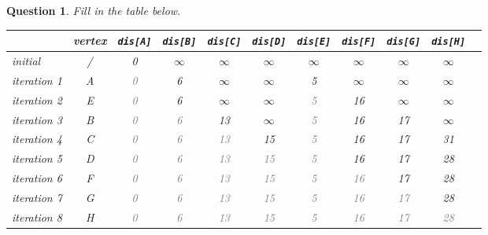 \documentclass[10.5pt]{article}
\newtheorem{Q}{Question}
\begin{document}
\begin{Q}
	Fill in the table below.
	\begin{table}[htbp]
		\begin{center}
			\begin{tabular}{|l|c|c|c|c|c|c|c|c|c| p{3cm}|}
				\hline
				            & vertex & \texttt{dis[A]}     & \texttt{dis[B]}     & \texttt{dis[C]}      & \texttt{dis[D]}      & \texttt{dis[E]}     & \texttt{dis[F]}      & \texttt{dis[G]}      & \texttt{dis[H]}      \\
				\hline
				initial     & /      & 0                   & $\infty$            & $\infty$             & $\infty$             & $\infty$            & $\infty$             & $\infty$             & $\infty$             \\
				\hline
				iteration 1 & A      & \textcolor{gray}{0} & 6                   & $\infty$             & $\infty$             & 5                   & $\infty$             & $\infty$             & $\infty$             \\
				\hline
				iteration 2 & E      & \textcolor{gray}{0} & 6                   & $\infty$             & $\infty$             & \textcolor{gray}{5} & 16                   & $\infty$             & $\infty$             \\
				\hline
				iteration 3 & B      & \textcolor{gray}{0} & \textcolor{gray}{6} & 13                   & $\infty$             & \textcolor{gray}{5} & 16                   & 17                   & $\infty$             \\
				\hline
				iteration 4 & C      & \textcolor{gray}{0} & \textcolor{gray}{6} & \textcolor{gray}{13} & 15                   & \textcolor{gray}{5} & 16                   & 17                   & 31                   \\
				\hline
				iteration 5 & D      & \textcolor{gray}{0} & \textcolor{gray}{6} & \textcolor{gray}{13} & \textcolor{gray}{15} & \textcolor{gray}{5} & 16                   & 17                   & 28                   \\
				\hline
				iteration 6 & F      & \textcolor{gray}{0} & \textcolor{gray}{6} & \textcolor{gray}{13} & \textcolor{gray}{15} & \textcolor{gray}{5} & \textcolor{gray}{16} & 17                   & 28                   \\
				\hline
				iteration 7 & G      & \textcolor{gray}{0} & \textcolor{gray}{6} & \textcolor{gray}{13} & \textcolor{gray}{15} & \textcolor{gray}{5} & \textcolor{gray}{16} & \textcolor{gray}{17} & 28                   \\
				\hline
				iteration 8 & H      & \textcolor{gray}{0} & \textcolor{gray}{6} & \textcolor{gray}{13} & \textcolor{gray}{15} & \textcolor{gray}{5} & \textcolor{gray}{16} & \textcolor{gray}{17} & \textcolor{gray}{28} \\
				\hline
			\end{tabular}
		\end{center}
	\end{table}
\end{Q}
\end{document}
